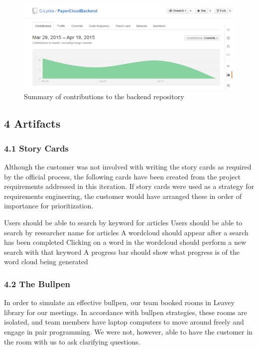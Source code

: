 \documentclass[]{article}
\begin{document}
\begin{figure}[htbp]
\centering
\includegraphics{images/contributions_back.png}
\caption{Summary of contributions to the backend repository}
\end{figure}

\subsection{4 Artifacts}\label{artifacts}

\subsubsection{4.1 Story Cards}\label{story-cards}

Although the customer was not involved with writing the story cards as
required by the official process, the following cards have been created
from the project requirements addressed in this iteration. If story
cards were used as a strategy for requirements engineering, the customer
would have arranged these in order of importance for prioritization.

Users should be able to search by keyword for articles Users should be
able to search by researcher name for articles A wordcloud should appear
after a search has been completed Clicking on a word in the wordcloud
should perform a new search with that keyword A progress bar should show
what progress is of the word cloud being generated

\subsubsection{4.2 The Bullpen}\label{the-bullpen}

In order to simulate an effective bullpen, our team booked rooms in
Leavey library for our meetings. In accordance with bullpen strategies,
these rooms are isolated, and team members have laptop computers to move
around freely and engage in pair programming. We were not, however, able
to have the customer in the room with us to ask clarifying questions.
\end{document}
